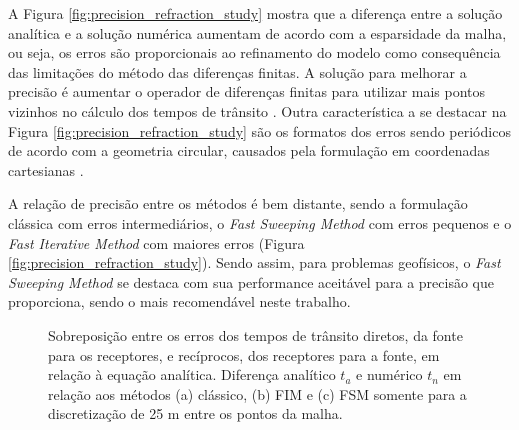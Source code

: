 A Figura \ref{fig:precision_refraction_study} mostra que a diferença entre a solução analítica e a solução numérica aumentam de acordo com a esparsidade da malha, ou seja, os erros são proporcionais ao refinamento do modelo como consequência das limitações do método das diferenças finitas. A solução para melhorar a precisão é aumentar o operador de diferenças finitas para utilizar mais pontos vizinhos no cálculo dos tempos de trânsito \cite{noble2014accurate,cai2023improved}. Outra característica a se destacar na Figura \ref{fig:precision_refraction_study} são os formatos dos erros sendo periódicos de acordo com a geometria circular, causados pela formulação em coordenadas cartesianas \cite{white2020pykonal}. 

A relação de precisão entre os métodos é bem distante, sendo a formulação clássica com erros intermediários, o \textit{Fast Sweeping Method} com erros pequenos e o \textit{Fast Iterative Method} com maiores erros (Figura \ref{fig:precision_refraction_study}). Sendo assim, para problemas geofísicos, o \textit{Fast Sweeping Method} se destaca com sua performance aceitável para a precisão que proporciona, sendo o mais recomendável neste trabalho.       

\begin{figure}[H]
	\centering
	\newline
	\newline
	
	\caption{Sobreposição entre os erros dos tempos de trânsito diretos, da fonte para os receptores, e recíprocos, dos receptores para a fonte, em relação à equação analítica. Diferença analítico $t_a$ e numérico $t_n$ em relação aos métodos (a) clássico, (b) FIM e (c) FSM somente para a discretização de 25 m entre os pontos da malha.}  
	\label{fig:reciprocity_refraction_study}
\end{figure}

